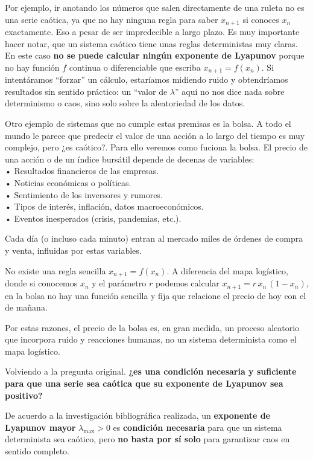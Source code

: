 \documentclass[
  10pt,
  a4paper,
  DIV=11,
  numbers=noendperiod,
  open=any]{scrreprt}
\numberwithin{equation}{chapter}
\numberwithin{equation}{chapter}
\renewcommand{\[}{\begin{equation}}
\renewcommand{\]}{\end{equation}}
\begin{document}
Por ejemplo, ir anotando los números que salen directamente de una
ruleta no es una serie caótica, ya que no hay ninguna regla para saber
\(x_{n+1}\) si conoces \(x_n\) exactamente. Eso a pesar de ser
impredecible a largo plazo. Es muy importante hacer notar, que un
sistema caótico tiene unas reglas deterministas muy claras. En este caso
\textbf{no se puede calcular ningún exponente de Lyapunov} porque no hay
función \(f\) continua o diferenciable que escriba \(x_{n+1} = f(x_n)\).
Si intentáramos ``forzar'' un cálculo, estaríamos midiendo ruido y
obtendríamos resultados sin sentido práctico: un ``valor de
\(\lambda\)'' aquí no nos dice nada sobre determinismo o caos, sino solo
sobre la aleatoriedad de los datos.

Otro ejemplo de sistemas que no cumple estas premisas es la bolsa. A
todo el mundo le parece que predecir el valor de una acción a lo largo
del tiempo es muy complejo, pero ¿es caótico?. Para ello veremos como
fuciona la bolsa. El precio de una acción o de un índice bursátil
depende de decenas de variables:\\
• Resultados financieros de las empresas.\\
• Noticias económicas o políticas.\\
• Sentimiento de los inversores y rumores.\\
• Tipos de interés, inflación, datos macroeconómicos.\\
• Eventos inesperados (crisis, pandemias, etc.).

Cada día (o incluso cada minuto) entran al mercado miles de órdenes de
compra y venta, influidas por estas variables.

No existe una regla sencilla \(x_{n+1} = f(x_n)\). A diferencia del mapa
logístico, donde si conocemos \(x_n\) y el parámetro \(r\) podemos
calcular \(x_{n+1} = r\,x_n\,(1 - x_n)\), en la bolsa no hay una función
sencilla y fija que relacione el precio de hoy con el de mañana.

Por estas razones, el precio de la bolsa es, en gran medida, un proceso
aleatorio que incorpora ruido y reacciones humanas, no un sistema
determinista como el mapa logístico.

Volviendo a la pregunta original. \textbf{¿es una condición necesaria y
suficiente para que una serie sea caótica que su exponente de Lyapunov
sea positivo?}

De acuerdo a la investigación bibliográfica realizada, un
\textbf{exponente de Lyapunov mayor} \(\lambda_{\max} > 0\) es
\textbf{condición necesaria} para que un sistema determinista sea
caótico, pero \textbf{no basta por sí solo} para garantizar caos en
sentido completo.
\end{document}

